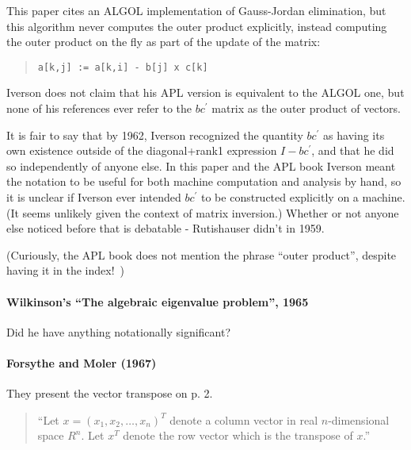 This paper cites an ALGOL implementation of Gauss-Jordan elimination, but this algorithm never computes the outer product explicitly, instead computing the outer product on the fly as part of the update of the matrix:~\cite{Cohen1961}

\begin{quote}
\begin{verbatim}
a[k,j] := a[k,i] - b[j] x c[k]
\end{verbatim}
\end{quote}

Iverson does not claim that his APL version is equivalent to the ALGOL one, but none of his references ever refer to the $b c^\prime$ matrix as the outer product of vectors.

It is fair to say that by 1962, Iverson recognized the quantity $b c^\prime$ as having its own existence outside of the diagonal+rank1 expression $I - b c^\prime$, and that he did so independently of anyone else. In this paper and the APL book Iverson meant the notation to be useful for both machine computation and analysis by hand, so it is unclear if Iverson ever intended $b c^\prime$ to be constructed explicitly on a machine. (It seems unlikely given the context of matrix inversion.) Whether or not anyone else noticed before that is debatable - Rutishauser didn't in 1959.

(Curiously, the APL book does not mention the phrase ``outer product'', despite having it in the index!~\cite{Iverson1962book})


\paragraph{Wilkinson's ``The algebraic eigenvalue problem'', 1965}

Did he have anything notationally significant?



\paragraph{Forsythe and Moler (1967)~\cite{Forsythe1967}}

They present the vector transpose on p. 2.
\begin{quote}
``Let $x = {(x_1, x_2, \dots, x_n)}^T$ denote a column vector in real $n$-dimensional space $R^n$. Let $x^T$ denote the row vector which is the transpose of $x$.''~\cite[p. 2]{Forsythe1967}
\end{quote}


